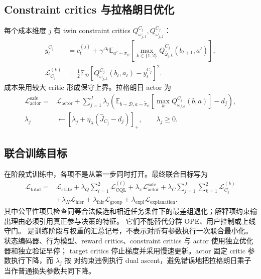\documentclass[11pt,a4paper,fontset=none]{ctexart}
\newcommand{\E}{\mathbb{E}}
\newcommand{\1}{\mathbb{I}}
\newcommand{\D}{\mathcal{D}}
\begin{document}
\subsection{Constraint critics 与拉格朗日优化}

每个成本维度 $j$ 有 twin constraint critics $Q^{C_j}_{\omega_{j,1}},Q^{C_j}_{\omega_{j,2}}$：
\begin{align}
  y_t^{C_j}&=c_t^{(j)}+\gamma^{\Delta_t}
  \E_{a'\sim\widetilde\pi_\psi}
  \left[\max_{k\in\{1,2\}}Q^{C_j}_{\bar\omega_{j,k}}(b_{t+1},a')\right],\\
  \mathcal{L}_{C_j}^{(k)}&=\frac12\E_\D
  \left[Q^{C_j}_{\omega_{j,k}}(b_t,a_t)-y_t^{C_j}\right]^2.
  \label{eq:constraint-critic}
\end{align}
成本采用较大 critic 形成保守上界。拉格朗日 actor 为
\begin{align}
  \mathcal{L}_{\mathrm{actor}}^{\mathrm{safe}}={}&
  \mathcal{L}_{\mathrm{actor}}
  +\sum_{j=1}^{J}\lambda_j
  \left(
    \E_{b\sim\D,a\sim\widetilde\pi_\psi}
      \left[\max_kQ^{C_j}_{\omega_{j,k}}(b,a)\right]-d_j
  \right),\\
  \lambda_j&\leftarrow
  \left[\lambda_j+\eta_\lambda
  \left(\widehat J_{C_j}-d_j\right)\right]_+,
  \qquad \lambda_j\ge 0.
  \label{eq:lagrangian-actor}
\end{align}

\subsection{联合训练目标}

在阶段式训练中，各项不是从第一步同时打开。最终联合目标写为
\begin{align}
  \mathcal{L}_{\mathrm{total}}={}&
  \mathcal{L}_{\mathrm{state}}
  +\lambda_Q\sum_{i=1}^{2}\mathcal{L}_{\mathrm{CQL}}^{(i)}
  +\lambda_\pi\mathcal{L}_{\mathrm{actor}}^{\mathrm{safe}}
  +\lambda_C\sum_{j=1}^{J}\sum_{k=1}^{2}\mathcal{L}_{C_j}^{(k)}\nonumber\\
  &+\lambda_H\mathcal{L}_{\mathrm{hier}}
  +\lambda_{\mathrm{fair}}\mathcal{L}_{\mathrm{group}}
  +\lambda_{\mathrm{expl}}\mathcal{L}_{\mathrm{explanation}}.
  \label{eq:total-loss}
\end{align}
其中公平性项只检查同等合法候选和相近任务条件下的最差组退化；解释项约束输出理由必须引用真正参与决策的特征。
它们不能替代分群 OPE、用户控制或上线守门。
 是训练阶段与权重的汇总记号，不表示对所有参数执行一次联合最小化。
状态编码器、行为模型、reward critics、constraint critics 与 actor 使用独立优化器和独立验证早停；
target critics 停止梯度并采用慢速更新。actor 固定 critic 参数执行下降，而 $\lambda_j$ 按
 对约束违例执行 dual ascent，避免错误地把拉格朗日乘子当作普通损失参数共同下降。
\end{document}
